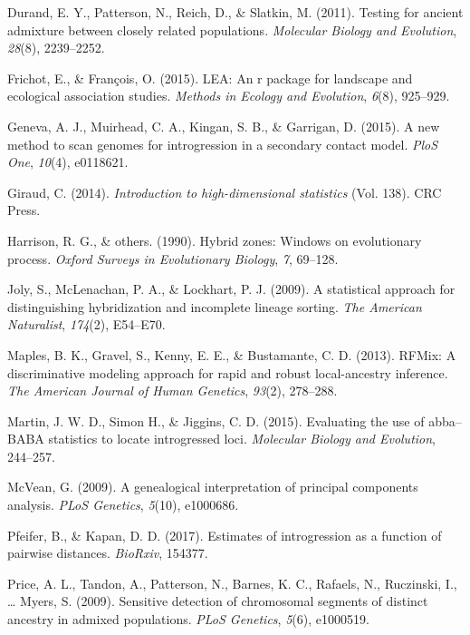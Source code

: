\documentclass[12pt,twoside]{reedthesis}
\begin{document}
  \hypertarget{ref-durand2011testing}{}
  Durand, E. Y., Patterson, N., Reich, D., \& Slatkin, M. (2011). Testing
  for ancient admixture between closely related populations.
  \emph{Molecular Biology and Evolution}, \emph{28}(8), 2239--2252.
  
  \hypertarget{ref-frichot2015lea}{}
  Frichot, E., \& François, O. (2015). LEA: An r package for landscape and
  ecological association studies. \emph{Methods in Ecology and Evolution},
  \emph{6}(8), 925--929.
  
  \hypertarget{ref-geneva2015new}{}
  Geneva, A. J., Muirhead, C. A., Kingan, S. B., \& Garrigan, D. (2015). A
  new method to scan genomes for introgression in a secondary contact
  model. \emph{PloS One}, \emph{10}(4), e0118621.
  
  \hypertarget{ref-giraud2014introduction}{}
  Giraud, C. (2014). \emph{Introduction to high-dimensional statistics}
  (Vol. 138). CRC Press.
  
  \hypertarget{ref-harrison1990hybrid}{}
  Harrison, R. G., \& others. (1990). Hybrid zones: Windows on
  evolutionary process. \emph{Oxford Surveys in Evolutionary Biology},
  \emph{7}, 69--128.
  
  \hypertarget{ref-joly2009statistical}{}
  Joly, S., McLenachan, P. A., \& Lockhart, P. J. (2009). A statistical
  approach for distinguishing hybridization and incomplete lineage
  sorting. \emph{The American Naturalist}, \emph{174}(2), E54--E70.
  
  \hypertarget{ref-maples2013rfmix}{}
  Maples, B. K., Gravel, S., Kenny, E. E., \& Bustamante, C. D. (2013).
  RFMix: A discriminative modeling approach for rapid and robust
  local-ancestry inference. \emph{The American Journal of Human Genetics},
  \emph{93}(2), 278--288.
  
  \hypertarget{ref-martin2000}{}
  Martin, J. W. D., Simon H., \& Jiggins, C. D. (2015). Evaluating the use
  of abba--BABA statistics to locate introgressed loci. \emph{Molecular
  Biology and Evolution}, 244--257.
  
  \hypertarget{ref-mcvean2009genealogical}{}
  McVean, G. (2009). A genealogical interpretation of principal components
  analysis. \emph{PLoS Genetics}, \emph{5}(10), e1000686.
  
  \hypertarget{ref-pfeifer2017estimates}{}
  Pfeifer, B., \& Kapan, D. D. (2017). Estimates of introgression as a
  function of pairwise distances. \emph{BioRxiv}, 154377.
  
  \hypertarget{ref-price2009sensitive}{}
  Price, A. L., Tandon, A., Patterson, N., Barnes, K. C., Rafaels, N.,
  Ruczinski, I., \ldots{} Myers, S. (2009). Sensitive detection of
  chromosomal segments of distinct ancestry in admixed populations.
  \emph{PLoS Genetics}, \emph{5}(6), e1000519.
  
\end{document}
